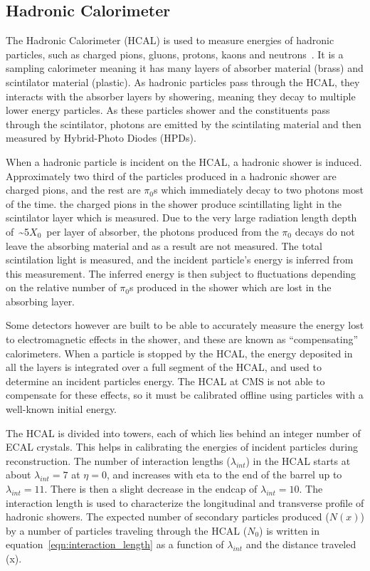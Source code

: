 \subsection{Hadronic Calorimeter}
\label {subs:HCAL}
The Hadronic Calorimeter (HCAL) is used to measure energies of hadronic particles, such as charged pions, gluons, protons, kaons and neutrons~\cite{hcalperformance}.
It is a sampling calorimeter meaning it has many layers of absorber material (brass) and scintilator material (plastic).
As hadronic particles pass through the HCAL, they interacts with the absorber layers by showering, meaning they decay to multiple lower energy particles.
As these particles shower and the constituents pass through the scintilator, photons are emitted by the scintilating material and then measured by Hybrid-Photo Diodes (HPDs).

When a hadronic particle is incident on the HCAL, a hadronic shower is induced.
Approximately two third of the particles produced in a hadronic shower are charged pions,
and the rest are $\pi_{0}$s which immediately decay to two photons most of the time.
the charged pions in the shower produce scintillating light in the scintilator layer which is measured.
Due to the very large radiation length depth of~\textasciitilde{}5$X_{0}$~per layer of absorber,
the photons produced from the $\pi_{0}$ decays do not leave the absorbing material and as a result are not measured.
The total scintilation light is measured, and the incident particle's energy is inferred from this measurement.
The inferred energy is then subject to fluctuations depending on the relative number of $\pi_{0}$s produced in the shower which are lost in the absorbing layer.

Some detectors however are built to be able to accurately measure the energy lost to electromagnetic effects in the shower, and these are known as ``compensating'' calorimeters.
When a particle is stopped by the HCAL, the energy deposited in all the layers is integrated over a full segment of the HCAL, and used to determine an incident particles energy.
The HCAL at CMS is not able to compensate for these effects, so it must be calibrated offline using particles with a well-known initial energy.

The HCAL is divided into towers, each of which lies behind an integer number of ECAL crystals.
This helps in calibrating the energies of incident particles during reconstruction.
The number of interaction lengths ($\lambda_{int}$) in the HCAL starts at about $\lambda_{int} = 7$ at $\eta = 0$, and increases with eta to the end of the barrel up to $\lambda_{int} = 11$.
There is then a slight decrease in the endcap of $\lambda_{int} = 10$.
The interaction length is used to characterize the longitudinal and transverse profile of hadronic showers.
The expected number of secondary particles produced ($N(x)$)
by a number of particles traveling through the HCAL ($N_{0}$)
is written in equation~\ref{eqn:interaction_length} as a function of $\lambda_{int}$ and the distance traveled (x).

